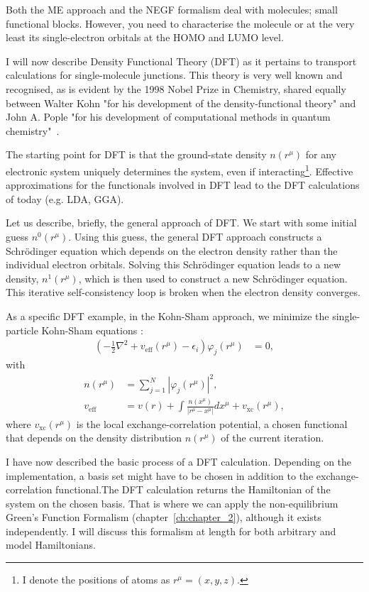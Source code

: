 Both the ME approach and the NEGF formalism deal with molecules; small functional blocks. However, you need to characterise the molecule or at the very least its single-electron orbitals at the HOMO and LUMO level. 

I will now describe Density Functional Theory (DFT) as it pertains to transport calculations for single-molecule junctions. This theory is very well known and recognised, as is evident by the 1998 Nobel Prize in Chemistry, shared equally between Walter Kohn "for his development of the density-functional theory" and John A. Pople "for his development of computational methods in quantum chemistry"~\cite{nobel1998}. 

The starting point for DFT is that the ground-state density $n(r^\mu)$ for any electronic system uniquely determines the system, even if interacting\footnote{I denote the positions of atoms as $r^\mu = (x,y,z)$.}. Effective approximations for the functionals involved in DFT lead to the DFT calculations of today (e.g. LDA, GGA). 

Let us describe, briefly, the general approach of DFT. We start with some initial guess $n^0(r^\mu)$. Using this guess, the general DFT approach constructs a Schr\"odinger equation which depends on the electron density rather than the individual electron orbitals\cite{joscomp}. Solving this Schr\"odinger equation leads to a new density, $n^1(r^\mu)$, which is then used to construct a new Schr\"odinger equation. This iterative self-consistency loop is broken when the electron density converges.

As a specific DFT example, in the Kohn-Sham approach, we minimize the single-particle Kohn-Sham equations \cite{kohnsham, joscomp}:
\begin{align}
\left( -\frac{1}{2} \nabla^2 + v_\text{eff} (r^\mu) - \epsilon_i \right) \varphi_j( r^\mu) &= 0, \label{eq:ks}
\end{align}
with
\begin{align*}
n(r^\mu) &= \sum_{j=1}^N \left| \varphi_j (r^\mu)\right|^2,\\
v_\text{eff} &= v(r) + \int \frac{n(x^\mu)}{\left|r^\mu - x^\mu\right|} dx^\mu + v_\text{xc}(r^\mu),
\end{align*}
where $v_\text{xc}(r^\mu)$ is the local exchange-correlation potential, a chosen functional that depends on the density distribution $n(r^\mu)$ of the current iteration.


I have now described the basic process of a DFT calculation. Depending on the implementation, a basis set might have to be chosen in addition to the exchange-\-correlation functional.The DFT calculation returns the Hamiltonian of the system on the chosen basis. That is where we can apply the non-equilibrium Green's Function Formalism (chapter~\ref{ch:chapter_2}), although it exists independently. I will discuss this formalism at length for both arbitrary and model Hamiltonians.

